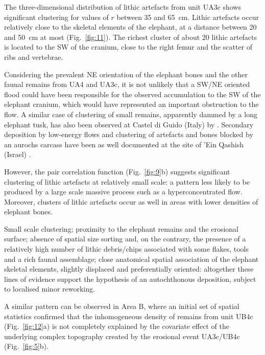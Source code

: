 \documentclass[preprint,authoryear,times]{elsarticle} %
\begin{document}
The three-dimensional distribution of lithic artefacts from unit UA3c shows significant clustering for values of $r$ between 35 and 65~cm. Lithic artefacts occur relatively close to the skeletal elements of the elephant, at a distance between 20 and 50~cm at most (Fig.~\ref{fig:11}). The richest cluster of about 20 lithic artefacts is located to the SW of the cranium, close to the right femur and the scatter of ribs and vertebrae.

Considering the prevalent NE orientation of the elephant bones and the other faunal remains from UA4 and UA3c, it is not unlikely that a SW/NE oriented flood could have been responsible for the observed accumulation to the SW of the elephant cranium, which would have represented an important obstruction to the flow. A similar case of clustering of small remains, apparently dammed by a long elephant tusk, has also been observed at Castel di Guido (Italy) by \cite{Boschian2010}. Secondary deposition by low-energy flows and clustering of artefacts and bones blocked by an aurochs carcass have been as well documented at the site of 'Ein Qashish (Israel) \citep{Hovers2014}.

However, the pair correlation function (Fig.~\ref{fig:9}b) suggests significant clustering of lithic artefacts at relatively small scale: a pattern less likely to be produced by a large scale massive process such as a hyperconcentrated flow. Moreover, clusters of lithic artefacts occur as well in areas with lower densities of elephant bones.

Small scale clustering; proximity to the elephant remains and the erosional surface; absence of spatial size sorting and, on the contrary, the presence of a relatively high number of lithic debris/chips associated with some flakes, tools and a rich faunal assemblage; close anatomical spatial association of the elephant skeletal elements, slightly displaced and preferentially oriented: altogether these lines of evidence support the hypothesis of an autochthonous deposition, subject to localised minor reworking.


A similar pattern can be observed in Area B, where an initial set of spatial statistics confirmed that the inhomogeneous density of remains from unit UB4c (Fig.~\ref{fig:12}a) is not completely explained by the covariate effect of the underlying complex topography created by the erosional event UA3c/UB4c (Fig.~\ref{fig:5}b).
\end{document}
